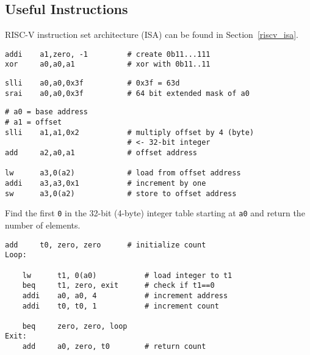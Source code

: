 \subsection{Useful Instructions}
RISC-V instruction set architecture (ISA)  can be found in Section\ \ref{riscv_isa}.

\newpar{}

\begin{lstlisting}[language={[RISC-V]Assembler}]
addi    a1,zero, -1         # create 0b11...111
xor     a0,a0,a1            # xor with 0b11..11
\end{lstlisting}

\newpar{}

\begin{lstlisting}[language={[RISC-V]Assembler}]
slli    a0,a0,0x3f          # 0x3f = 63d
srai    a0,a0,0x3f          # 64 bit extended mask of a0
\end{lstlisting}

\newpar{}

\begin{lstlisting}[language={[RISC-V]Assembler}]
# a0 = base address
# a1 = offset
slli    a1,a1,0x2           # multiply offset by 4 (byte) 
                            # <- 32-bit integer
add     a2,a0,a1            # offset address

lw      a3,0(a2)            # load from offset address
addi    a3,a3,0x1           # increment by one
sw      a3,0(a2)            # store to offset address
\end{lstlisting}

\newpar{}

Find the first \texttt{0} in the 32-bit (4-byte) integer table starting at \texttt{a0} and return the number of elements.
\begin{lstlisting}[language={[RISC-V]Assembler}]
    add     t0, zero, zero      # initialize count
Loop:

    lw      t1, 0(a0)           # load integer to t1
    beq     t1, zero, exit      # check if t1==0
    addi    a0, a0, 4           # increment address
    addi    t0, t0, 1           # increment count

    beq     zero, zero, loop
Exit:
    add     a0, zero, t0        # return count
\end{lstlisting}


\newpar{}

